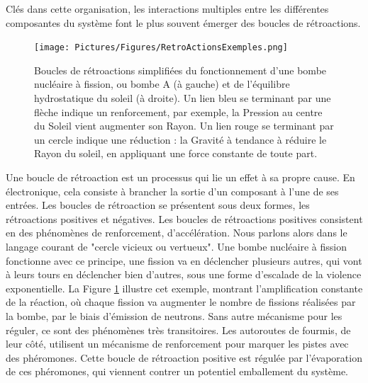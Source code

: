 			Clés dans cette organisation, les interactions multiples entre les différentes composantes du système font le plus souvent émerger des boucles de rétroactions.
			
			\begin{figure}
			\centering
			\texttt{[image: Pictures/Figures/RetroActionsExemples.png]}
			\caption{Boucles de rétroactions simplifiées du fonctionnement d'une bombe nucléaire à fission, ou bombe A (à gauche) et de l'équilibre hydrostatique du soleil (à droite). Un lien bleu se terminant par une flèche indique un renforcement, par exemple, la Pression au centre du Soleil vient augmenter son Rayon. Un lien rouge se terminant par un cercle indique une réduction : la Gravité à tendance à réduire le Rayon du soleil, en appliquant une force constante de toute part.}
			\label{retroActions}
			\end{figure}
		
		Une boucle de rétroaction est un processus qui lie un effet à sa propre cause. En électronique, cela consiste à brancher la sortie d'un composant à l'une de ses entrées. Les boucles de rétroaction se présentent sous deux formes, les rétroactions positives et négatives. Les boucles de rétroactions positives consistent en des phénomènes de renforcement, d'accélération. Nous parlons alors dans le langage courant de "cercle vicieux ou vertueux". Une bombe nucléaire à fission fonctionne avec ce principe, une fission va en déclencher plusieurs autres, qui vont à leurs tours en déclencher bien d'autres, sous une forme d'escalade de la violence exponentielle. La Figure \ref{retroActions} illustre cet exemple, montrant l'amplification constante de la réaction, où chaque fission va augmenter le nombre de fissions réalisées par la bombe, par le biais d'émission de neutrons. Sans autre mécanisme pour les réguler, ce sont des phénomènes très transitoires. Les autoroutes de fourmis, de leur côté, utilisent un mécanisme de renforcement pour marquer les pistes avec des phéromones. Cette boucle de rétroaction positive est régulée par l'évaporation de ces phéromones, qui viennent contrer un potentiel emballement du système. 
		
